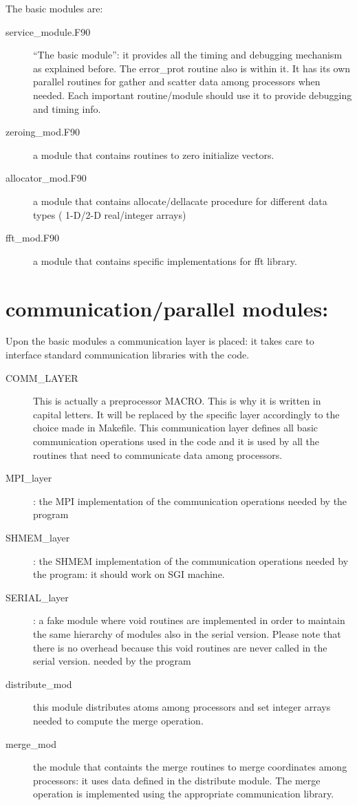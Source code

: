 The basic modules are: 
\begin{description}
\item[ service\_module.F90] ``The basic module'': it provides all the timing
and debugging mechanism as explained before.  The error\_prot routine also
is within it. It has its own parallel routines for gather and scatter data
among processors when needed.  Each important routine/module should use it
to provide debugging and timing info.
 
\item[ zeroing\_mod.F90] a module that contains routines to zero initialize
 vectors.
\item[ allocator\_mod.F90] a module that contains allocate/dellacate
procedure for different data types ( 1-D/2-D real/integer arrays)
\item[ fft\_mod.F90] a module that contains specific implementations for
fft library.
\end{description}


\section { communication/parallel modules: }

Upon the basic modules a communication layer is placed: it takes care
to interface standard communication libraries with the code.
 
\begin{description}
\item[ COMM\_LAYER]
 This is actually a preprocessor MACRO. This is why it is written in
 capital letters. It will be replaced by the specific layer accordingly to
 the choice made in Makefile. This communication layer defines all basic
 communication operations used in the code and it
 is used by all the routines that need to communicate data among
 processors.
\item[ MPI\_layer]: the MPI implementation of the communication operations
needed by the program
\item[ SHMEM\_layer]: the SHMEM implementation of the communication operations
needed by the program: it should work on SGI machine. 
\item[ SERIAL\_layer]: a fake module where void routines are implemented in
order to maintain the same hierarchy of modules also in the serial
version. Please note that there is no overhead because this void routines
are never called in the serial version.
needed by the program

\item[ distribute\_mod]
 this module distributes atoms among processors and set integer arrays
 needed to compute the merge operation.

\item[ merge\_mod] 
 the module that containts the merge routines to merge coordinates among
 processors: it uses data defined in the distribute module. The merge
 operation is implemented using the appropriate communication library.  

\end{description}

